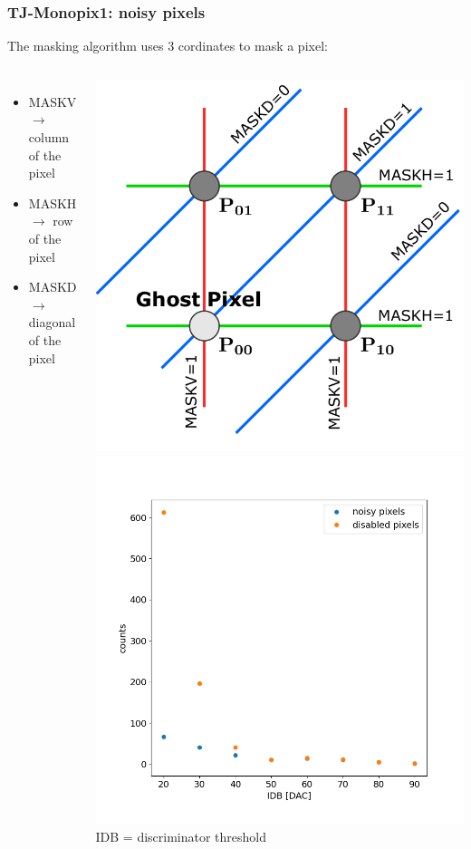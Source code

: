     \begin{frame}[noframenumbering]
        \frametitle{TJ-Monopix1: noisy pixels}
        The masking algorithm uses 3 cordinates to mask a pixel: 
        \begin{columns}
            \small
            \begin{itemize}
                \item MASKV $\rightarrow$ column of the pixel
                \item MASKH $\rightarrow$ row of the pixel
                \item MASKD $\rightarrow$ diagonal of the pixel
            \end{itemize}   
            \centering             
            \includegraphics[width=.7\linewidth]{figures/Monopix1/masking_scheme.png}        
                \includegraphics[width=1.1\linewidth]{figures/charaterization/noisy.png}
                \centering IDB = discriminator threshold 
        \end{columns}


\end{frame}
